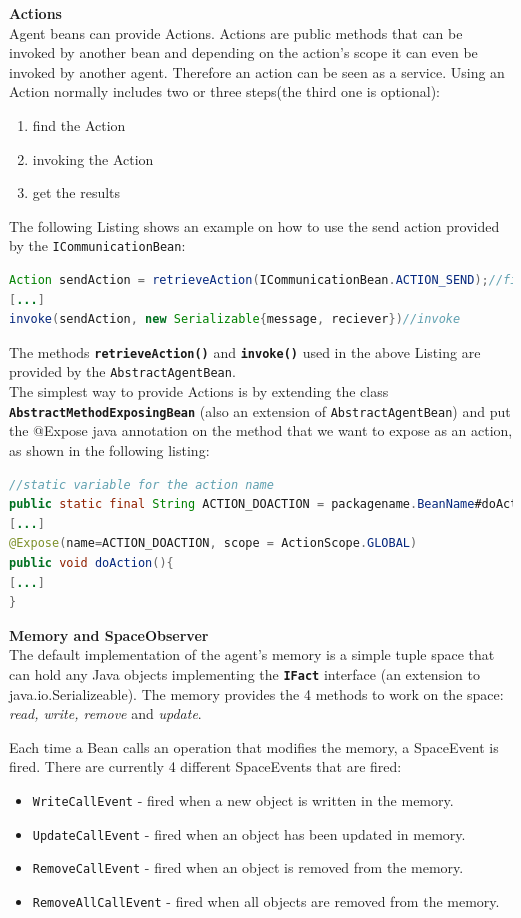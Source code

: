 \textbf{Actions}\\
Agent beans can provide Actions. Actions are public methods that can be invoked by another bean and depending on the action's scope it can even be invoked by another agent. Therefore an action can be seen as a service. 
Using an Action normally includes two or three steps(the third one is optional):
\begin{enumerate}
	\item find the Action
	\item invoking the Action
	\item get the results
\end{enumerate}
The following Listing shows an example on how to use the send action provided by the \texttt{ICommunicationBean}:
\begin{lstlisting}[language = Java, caption = Using an Action]
Action sendAction = retrieveAction(ICommunicationBean.ACTION_SEND);//find action
[...]
invoke(sendAction, new Serializable{message, reciever})//invoke
\end{lstlisting}
The methods \textbf{\texttt{retrieveAction()}} and \textbf{\texttt{invoke()}} used in the above Listing are provided  by the \texttt{AbstractAgentBean}.\\

The simplest way to provide Actions is by extending the class \textbf{\texttt{AbstractMethodExposingBean}} (also an extension of \texttt{AbstractAgentBean}) and put the @Expose java annotation on the method that we want to expose as an action, as shown in the following listing:
\begin{lstlisting}[language = Java, caption = Providing an Action]
//static variable for the action name
public static final String ACTION_DOACTION = packagename.BeanName#doAction;
[...]
@Expose(name=ACTION_DOACTION, scope = ActionScope.GLOBAL)
public void doAction(){
[...]
}
\end{lstlisting}

\textbf{Memory and SpaceObserver}\\
The default implementation of the agent's memory is a simple tuple space that can hold any Java objects implementing the \textbf{\texttt{IFact}} interface (an extension to java.io.Serializeable). The memory provides the 4 methods to work on the space:\textit{ read, write, remove} and \textit{update}.

Each time a Bean calls an operation that modifies the memory, a SpaceEvent is fired. There are currently 4 different SpaceEvents that are fired:
\begin{itemize}
	\item \texttt{WriteCallEvent} - fired when a new object is written in the memory.
	\item \texttt{UpdateCallEvent} - fired when an object has been updated in memory.
	\item \texttt{RemoveCallEvent} - fired when an object is removed from the memory.
	\item \texttt{RemoveAllCallEvent} - fired when all objects are removed from the memory.
\end{itemize}

